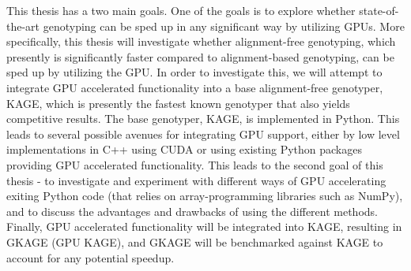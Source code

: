 This thesis has a two main goals.
One of the goals is to explore whether state-of-the-art genotyping can be sped up in any significant way by utilizing GPUs.
More specifically, this thesis will investigate whether alignment-free genotyping, which presently is significantly faster compared to alignment-based genotyping, can be sped up by utilizing the GPU.
In order to investigate this, we will attempt to integrate GPU accelerated functionality into a base alignment-free genotyper, KAGE, which is presently the fastest known genotyper that also yields competitive results.
The base genotyper, KAGE, is implemented in Python.
This leads to several possible avenues for integrating GPU support, either by low level implementations in C++ using CUDA or using existing Python packages providing GPU accelerated functionality.
This leads to the second goal of this thesis - to investigate and experiment with different ways of GPU accelerating exiting Python code (that relies on array-programming libraries such as NumPy), and to discuss the advantages and drawbacks of using the different methods.
Finally, GPU accelerated functionality will be integrated into KAGE, resulting in GKAGE (GPU KAGE), and GKAGE will be benchmarked against KAGE to account for any potential speedup.
